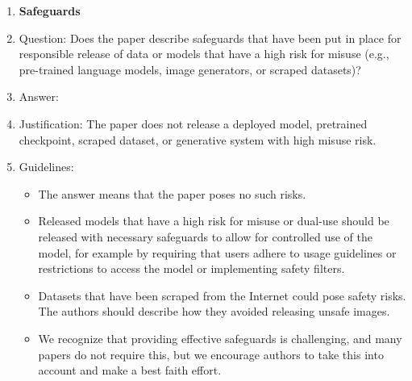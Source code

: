 \documentclass{article}
\begin{document}
\begin{enumerate}
\item {\bf Safeguards}
    \item[] Question: Does the paper describe safeguards that have been put in place for responsible release of data or models that have a high risk for misuse (e.g., pre-trained language models, image generators, or scraped datasets)?
    \item[] Answer: \answerNA{} %
    \item[] Justification: The paper does not release a deployed model, pretrained checkpoint, scraped dataset, or generative system with high misuse risk.
    \item[] Guidelines:
    \begin{itemize}
        \item The answer \answerNA{} means that the paper poses no such risks.
        \item Released models that have a high risk for misuse or dual-use should be released with necessary safeguards to allow for controlled use of the model, for example by requiring that users adhere to usage guidelines or restrictions to access the model or implementing safety filters. 
        \item Datasets that have been scraped from the Internet could pose safety risks. The authors should describe how they avoided releasing unsafe images.
        \item We recognize that providing effective safeguards is challenging, and many papers do not require this, but we encourage authors to take this into account and make a best faith effort.
    \end{itemize}


\end{enumerate}
\end{document}
